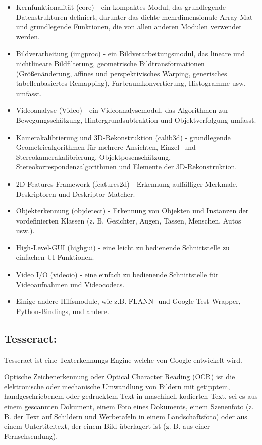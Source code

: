 \begin{itemize}
    \item Kernfunktionalität (core) - ein kompaktes Modul, das grundlegende Datenstrukturen definiert, darunter das dichte mehrdimensionale Array Mat und grundlegende Funktionen, die von allen anderen Modulen verwendet werden.
    \item Bildverarbeitung (imgproc) - ein Bildverarbeitungsmodul, das lineare und nichtlineare Bildfilterung, geometrische Bildtransformationen (Größenänderung, affines und perspektivisches Warping, generisches tabellenbasiertes Remapping), Farbraumkonvertierung, Histogramme usw. umfasst.
    \item Videoanalyse (Video) - ein Videoanalysemodul, das Algorithmen zur Bewegungsschätzung, Hintergrundsubtraktion und Objektverfolgung umfasst.
    \item Kamerakalibrierung und 3D-Rekonstruktion (calib3d) - grundlegende Geometriealgorithmen für mehrere Ansichten, Einzel- und Stereokamerakalibrierung, Objektposenschätzung, Stereokorrespondenzalgorithmen und Elemente der 3D-Rekonstruktion.
    \item 2D Features Framework (features2d) - Erkennung auffälliger Merkmale, Deskriptoren und Deskriptor-Matcher.
    \item Objekterkennung (objdetect) - Erkennung von Objekten und Instanzen der vordefinierten Klassen (z. B. Gesichter, Augen, Tassen, Menschen, Autos usw.).
    \item High-Level-GUI (highgui) - eine leicht zu bedienende Schnittstelle zu einfachen UI-Funktionen.
    \item Video I/O (videoio) - eine einfach zu bedienende Schnittstelle für Videoaufnahmen und Videocodecs.
    \item Einige andere Hilfsmodule, wie z.B. FLANN- und Google-Test-Wrapper, Python-Bindings, und andere.
\end{itemize}
 \subsection{Tesseract: } Tesseract ist eine Texterkennungs-Engine welche von Google entwickelt wird. 

 Optische Zeichenerkennung oder Optical Character Reading (OCR) ist die elektronische oder mechanische Umwandlung von Bildern mit getipptem, handgeschriebenem oder gedrucktem Text in maschinell kodierten Text, sei es aus einem gescannten Dokument, einem Foto eines Dokuments, einem Szenenfoto (z. B. der Text auf Schildern und Werbetafeln in einem Landschaftsfoto) oder aus einem Untertiteltext, der einem Bild überlagert ist (z. B. aus einer Fernsehsendung).
 \cite{ocrWiki}

